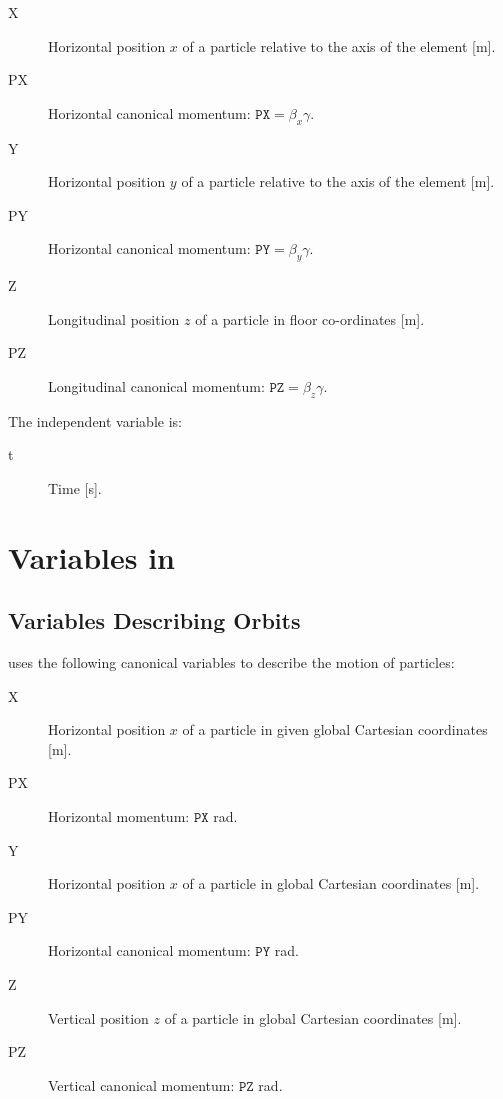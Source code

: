 \begin{description}
\item[X]
  Horizontal position $x$ of a particle relative to the axis of the element [m].

\item[PX]
  Horizontal canonical momentum:
  $\mathtt{PX} = \beta_x \gamma$.

\item[Y]
  Horizontal position $y$ of a particle relative to the axis of the element [m].

\item[PY]
  Horizontal canonical momentum:
  $\mathtt{PY} = \beta_y \gamma$.

\item[Z]
  Longitudinal position $z$ of a particle in floor co-ordinates [m].

\item[PZ]
 Longitudinal canonical momentum: 
 $\mathtt{PZ} = \beta_z \gamma$.

 \end{description}

The independent variable is:
\begin{description}
\item[t]
  Time [s].
\end{description}

\section{Variables in \opalcycl}
\label{sec:variablesopalcycl}

\subsection{Variables Describing Orbits}
\label{sec:opalcycl:canon}

\opalcycl uses the following canonical variables to describe the motion of particles:

\begin{description}
\item[X]
  Horizontal position $x$ of a particle in given global Cartesian coordinates [m].

\item[PX]
  Horizontal momentum:
  $\mathtt{PX}$ rad.

\item[Y]
  Horizontal position $x$ of a particle in global Cartesian coordinates [m].

\item[PY]
  Horizontal canonical momentum:
  $\mathtt{PY} $ rad.

\item[Z]
  Vertical position $z$ of a particle in global Cartesian coordinates [m].

\item[PZ]
  Vertical canonical momentum:
  $\mathtt{PZ}  $ rad.

\end{description}

